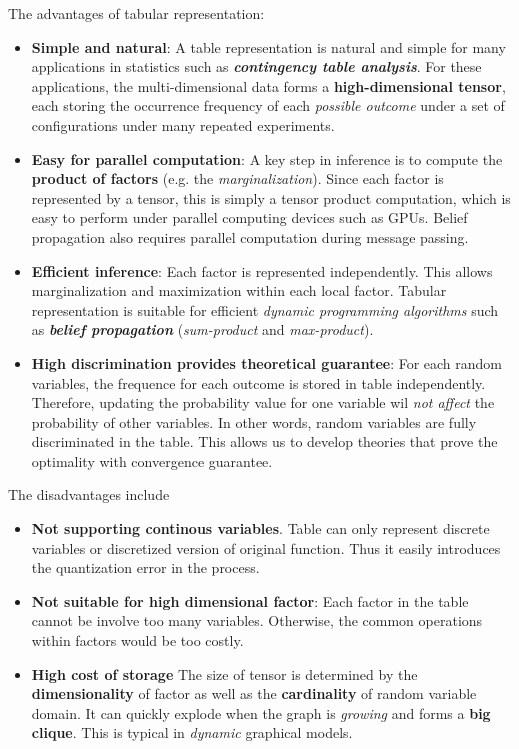 \documentclass[11pt]{article}
\begin{document}
The advantages of tabular representation:
\begin{itemize}
\item \textbf{Simple and natural}: A table representation is natural and simple for many applications in statistics such as \emph{\textbf{contingency table analysis}}. For these applications, the multi-dimensional data forms a \textbf{high-dimensional tensor}, each storing the occurrence frequency of each \emph{possible outcome} under a set of configurations under many repeated experiments.

\item \textbf{Easy for parallel computation}: A key step in inference is to compute the \textbf{product of factors} (e.g. the \emph{marginalization}). Since each factor is represented by a tensor, this is simply a tensor product computation, which is easy to perform under parallel computing devices such as GPUs. Belief propagation also requires parallel computation during message passing. 

\item \textbf{Efficient inference}: Each factor is represented independently. This allows marginalization and maximization within each local factor. Tabular representation is suitable for efficient \emph{dynamic programming algorithms} such as \emph{\textbf{belief propagation}} (\emph{sum-product} and \emph{max-product}).

\item \textbf{High discrimination provides theoretical guarantee}: For each random variables, the frequence for each outcome is stored in table independently. Therefore, updating the probability value for one variable wil \emph{not affect} the probability of other variables. In other words,  random variables are fully discriminated in the table. This allows us to develop theories that prove the optimality with convergence guarantee. 
\end{itemize}

The disadvantages include
\begin{itemize}
\item \textbf{Not supporting continous variables}. Table can only represent discrete variables or discretized version of original function. Thus it easily introduces the quantization error in the process. 

\item \textbf{Not suitable for high dimensional factor}: Each factor in the table cannot be involve too many variables. Otherwise, the common operations within factors would be too costly. 

\item \textbf{High cost of storage} The size of tensor is determined by the \textbf{dimensionality} of factor as well as the \textbf{cardinality} of random variable domain. It can quickly explode when the graph is \emph{growing} and forms a \textbf{big clique}. This is typical in \emph{dynamic} graphical models. 
\end{itemize}
\end{document}
